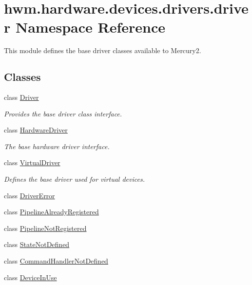 \hypertarget{namespacehwm_1_1hardware_1_1devices_1_1drivers_1_1driver}{\section{hwm.\-hardware.\-devices.\-drivers.\-driver Namespace Reference}
\label{namespacehwm_1_1hardware_1_1devices_1_1drivers_1_1driver}
}


This module defines the base driver classes available to Mercury2.  


\subsection*{Classes}
\begin{DoxyCompactItemize}
\item 
class \hyperlink{classhwm_1_1hardware_1_1devices_1_1drivers_1_1driver_1_1_driver}{Driver}
\begin{DoxyCompactList}\small\item\em Provides the base driver class interface. \end{DoxyCompactList}\item 
class \hyperlink{classhwm_1_1hardware_1_1devices_1_1drivers_1_1driver_1_1_hardware_driver}{Hardware\-Driver}
\begin{DoxyCompactList}\small\item\em The base hardware driver interface. \end{DoxyCompactList}\item 
class \hyperlink{classhwm_1_1hardware_1_1devices_1_1drivers_1_1driver_1_1_virtual_driver}{Virtual\-Driver}
\begin{DoxyCompactList}\small\item\em Defines the base driver used for virtual devices. \end{DoxyCompactList}\item 
class \hyperlink{classhwm_1_1hardware_1_1devices_1_1drivers_1_1driver_1_1_driver_error}{Driver\-Error}
\item 
class \hyperlink{classhwm_1_1hardware_1_1devices_1_1drivers_1_1driver_1_1_pipeline_already_registered}{Pipeline\-Already\-Registered}
\item 
class \hyperlink{classhwm_1_1hardware_1_1devices_1_1drivers_1_1driver_1_1_pipeline_not_registered}{Pipeline\-Not\-Registered}
\item 
class \hyperlink{classhwm_1_1hardware_1_1devices_1_1drivers_1_1driver_1_1_state_not_defined}{State\-Not\-Defined}
\item 
class \hyperlink{classhwm_1_1hardware_1_1devices_1_1drivers_1_1driver_1_1_command_handler_not_defined}{Command\-Handler\-Not\-Defined}
\item 
class \hyperlink{classhwm_1_1hardware_1_1devices_1_1drivers_1_1driver_1_1_device_in_use}{Device\-In\-Use}
\end{DoxyCompactItemize}


